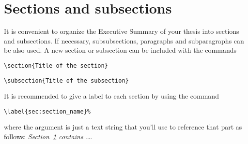 \section{Sections and subsections}
\label{sec:sec_and_subsec}
It is convenient to organize the Executive Summary of your thesis into sections and subsections. 
If necessary, subsubsections, paragraphs and subparagraphs can be also used. 
A new section or subsection can be included  with the commands
\begin{verbatim}
\section{Title of the section}
\end{verbatim}
\begin{verbatim}
\subsection{Title of the subsection}
\end{verbatim}
It is recommended to give a label to each section by using the command
\begin{verbatim}
\label{sec:section_name}%
\end{verbatim}
where the argument is just a text string that you'll use to reference that part
as follows: \textit{Section~\ref{sec:sec_and_subsec} contains   \dots}.
